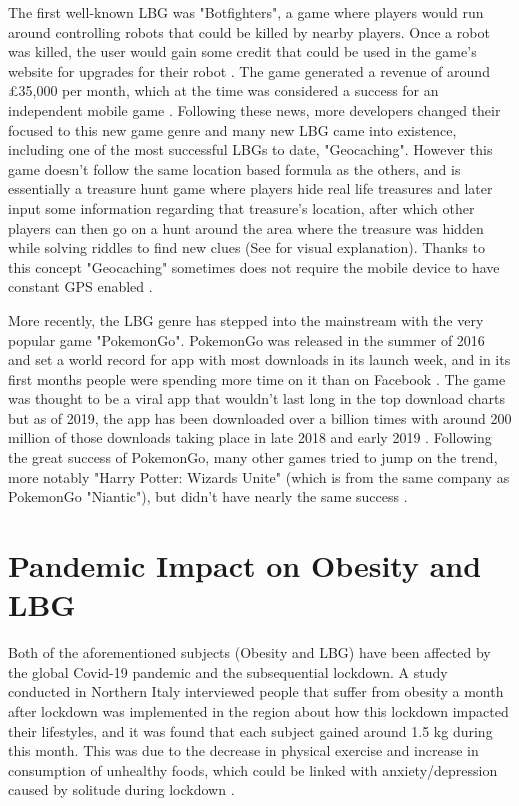 \documentclass{dissertation}
\begin{document}
The first well-known LBG was "Botfighters", a game where players would run around controlling robots that could be killed by nearby players. Once a robot was 
killed, the user would gain some credit that could be used in the game's website for upgrades for their robot \citep{Guardian02}. The game generated a revenue 
of around £35,000 per month, which at the time was considered a success for an independent mobile game \citep{Guardian02}. Following these news, more 
developers changed their focused to this new game genre and many new LBG came into existence, including one of the most successful LBGs to date, "Geocaching". 
However this game doesn't follow the same location based formula as the others, and is essentially a treasure hunt game where players hide real life treasures and later input 
some information regarding that treasure's location, after which other players can then go on a hunt around the area where the treasure was hidden while 
solving riddles to find new clues (See \citep{Geocaching17} for visual explanation). Thanks to this concept "Geocaching" sometimes does not require the mobile device to have 
constant GPS enabled \citep{Jacob10}.

More recently, the LBG genre has stepped into the mainstream with the very popular game "PokemonGo". PokemonGo was released in the summer of 2016 and 
set a world record for app with most downloads in its launch week, and in its first months people were spending more time on it than on Facebook \citep{Techspot19}.
The game was thought to be a viral app that wouldn't last long in the top download charts but as of 2019, the app has been downloaded over a billion times with around 
200 million of those downloads taking place in late 2018 and early 2019 \citep{Techspot19}. Following the great success of PokemonGo, many other games tried to jump on 
the trend, more notably "Harry Potter: Wizards Unite" (which is from the same company as PokemonGo "Niantic"), but didn't have nearly the same success \citep{Verge19}.

\section{Pandemic Impact on Obesity and LBG}

Both of the aforementioned subjects (Obesity and LBG) have been affected by the global Covid-19 pandemic and the subsequential lockdown. A study conducted in Northern Italy 
interviewed people that suffer from obesity a month after lockdown was implemented in the region about how this lockdown impacted their lifestyles, and it was found that each subject gained around 1.5 kg during this month. This was due to the decrease in physical exercise and increase in consumption of unhealthy foods, which could be linked with anxiety/depression caused by solitude during lockdown \citep{Pellegrini20}.
\end{document}
